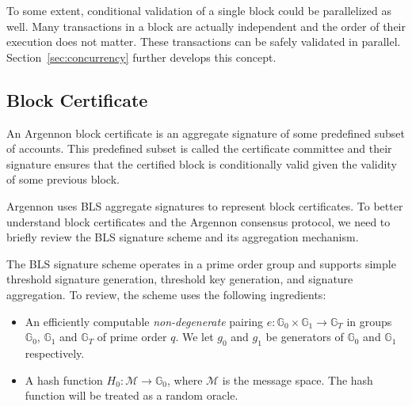To some extent, conditional validation of a single block could be parallelized as well. Many transactions
in a block are actually independent and the order of their execution does not
matter. These transactions can be safely validated in parallel. Section~\ref{sec:concurrency} further
develops this concept.


\subsection{Block Certificate}\label{subsec:block-certificate}

An Argennon block certificate is an aggregate signature of some predefined subset of accounts. This predefined subset
is called the certificate committee and their signature ensures that the certified block is conditionally
valid given the validity of some previous block.

Argennon uses BLS aggregate signatures to represent block certificates. To better understand block certificates and
the Argennon consensus protocol, we need to briefly review the BLS signature scheme and its aggregation mechanism.

The BLS signature scheme operates in a prime order group and supports simple threshold signature generation,
threshold key generation, and signature aggregation. To review, the scheme uses the following ingredients:

\newcommand{\G}{\mathbb{G}}
\newcommand{\Z}{\mathbb{Z}}
\newcommand{\adv}{{\cal A}}
\newcommand{\bdv}{{\cal B}}
\newcommand{\deq}{\mathrel{\mathop:}=}
\newcommand{\SK}{\mathit{sk}}
\newcommand{\PK}{\mathit{pk}}
\newcommand{\C}{\mathit{cert}}
\newcommand{\APK}{\mathit{apk}}
\newcommand{\DPK}{\mathit{\Delta pk}}
\newcommand{\MM}{\mathcal{M}}
\newcommand{\xwedge}{\, \operatorname{\text{$\wedge$}}\, }
\newcommand{\abs}[1]{\lvert #1 \rvert}
\newcommand{\Hm}{H_0}
\newcommand{\Hpk}{H_1}
\newcommand{\qHpk}{Q_{\Hpk}}
\newcommand{\qHm}{Q_{\Hm}}
\newcommand{\qsig}{Q_{\text{sig}}}

\begin{itemize}
    \item An efficiently computable \emph{non-degenerate} pairing $e:\G_0 \times \G_1 \to \G_T$
    in groups $\G_0$, $\G_1$ and $\G_T$ of prime order $q$. We let $g_0$ and $g_1$ be generators
    of $\G_0$ and $\G_1$ respectively.
    \item A hash function $H_0: \mathcal{M} \rightarrow \mathbb{G}_0$, where $\mathcal{M}$ is the message space.
    The hash function will be treated as a random oracle.
\end{itemize}

